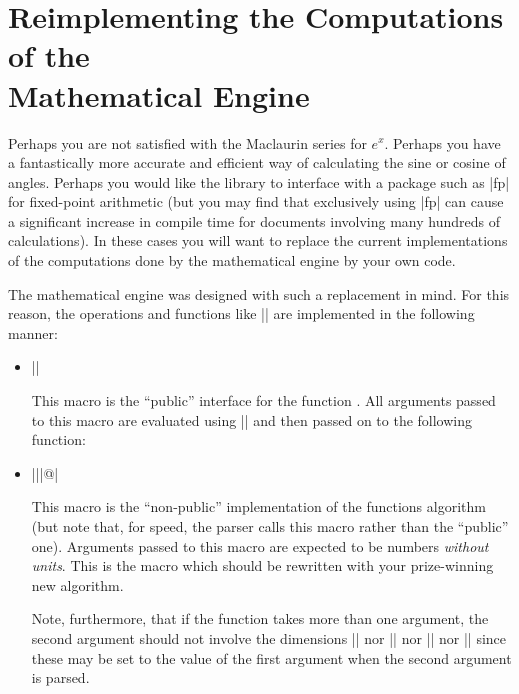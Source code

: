 %
%
%


\section[Reimplementing the Computations of the Mathematical Engine]
  {Reimplementing the Computations of the\\ Mathematical Engine}

\label{pgfmath-reimplement}

Perhaps you are not satisfied with the Maclaurin series for
$e^x$. Perhaps you have a fantastically more accurate
and efficient way of calculating the sine or cosine of angles. Perhaps
 you would like the library to interface with a package such as |fp| 
 for fixed-point arithmetic (but you may find that exclusively
 using |fp| can cause a significant increase in compile time for
 documents involving many hundreds of calculations).
In these cases you will want to replace the current implementations of
the computations done by the mathematical engine by your own code. 

The mathematical engine was designed with such a replacement in
mind. For this reason, the operations and functions like |\pgfmathadd|
are implemented in the following manner: 

\begin{itemize}
\item |\pgfmath| 

  This macro is the ``public'' interface for the function
  . All arguments passed to this macro are 
  evaluated using |\pgfmathparse| and then passed on to the following
  function:
  
\item |\pgfmath||@|
  
  This macro is the ``non-public'' implementation of the functions 
  algorithm (but note that, for speed, the parser calls this macro 
  rather than the ``public'' one). Arguments passed to this macro 
  are expected to be numbers \emph{without units}. This is the macro 
  which should be rewritten with your prize-winning new algorithm.

  Note, furthermore, that if the function takes more than one
  argument, the second argument should not involve the dimensions
  |\pgfmath@x| nor |\pgfmath@xa| nor |\pgf@x| nor |\pgf@xa| since
  these may be set to the value of the first argument when the
  second argument is parsed.
\end{itemize}

